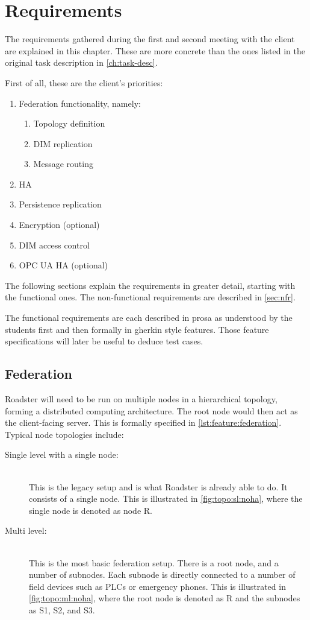 \chapter{Requirements}\label{ch:reqs}
The requirements gathered during the first and second meeting with the client are
explained in this chapter. These are more concrete than the ones listed in the
original task description in \autoref{ch:task-desc}.

First of all, these are the client's priorities:

\begin{enumerate}
\item Federation functionality, namely:
	\begin{enumerate}
		\item Topology definition
		\item DIM replication
		\item Message routing
	\end{enumerate}
\item \Gls{HA}
\item Persistence replication
\item Encryption (optional)
\item DIM access control
\item OPC UA \gls{HA} (optional)
\end{enumerate}

The following sections explain the requirements in greater detail, starting
with the functional ones. The non-functional requirements are described in
\autoref{sec:nfr}.

The functional requirements are each described in prosa as understood by the
students first and then formally in \gls{gherkin} style features. Those feature
specifications will later be useful to deduce test cases.

\section{Federation}
Roadster will need to be run on multiple nodes in a hierarchical topology,
forming a distributed computing architecture. The root node would then act as
the client-facing server. This is formally specified in
\autoref{lst:feature:federation}. Typical node topologies include:

\begin{description}
	\item [ Single level with a single node: ] \hfill\\
		This is the legacy setup and is what Roadster is already able
		to do. It consists of a single node. This is illustrated in
		\autoref{fig:topo:sl:noha}, where the single node is denoted as node R.

	\item [ Multi level: ] \hfill\\
		This is the most basic federation setup. There is a root node, and
		a number of subnodes. Each subnode is directly connected to a number of field devices such as
		\glspl{PLC} or emergency phones. This is illustrated in
		\autoref{fig:topo:ml:noha}, where the root node is denoted as R
		and the subnodes as S1, S2, and S3.
\end{description}

